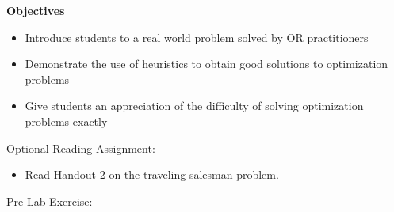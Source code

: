 \documentclass[twoside]{article}%
\begin{document}

\textbf{Objectives}
\begin{itemize}
\item   Introduce students to a real world problem solved by OR practitioners
\item   Demonstrate the use of heuristics to obtain good solutions to optimization
problems
\item  Give students an appreciation of the difficulty of solving
optimization problems exactly
\end{itemize}

\vspace{2pt}


\noindent
Optional Reading Assignment:

\begin{itemize}
\item
Read Handout 2 on the traveling salesman problem.
\end{itemize}

\noindent
Pre-Lab Exercise:
\end{document}
